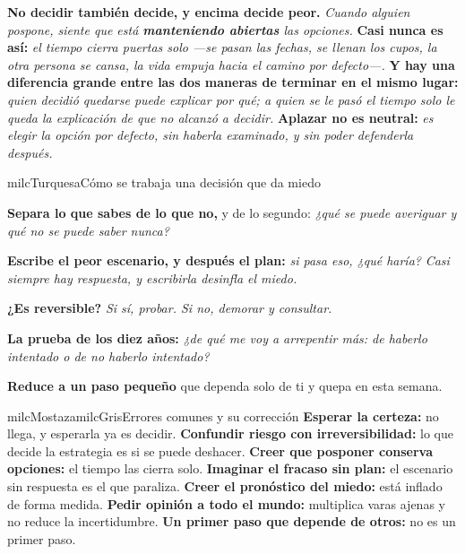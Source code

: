 \documentclass[11pt,letterpaper]{article}
\newcommand{\milcpaso}[3]{%
\Needspace{4\baselineskip}%
\begin{tcolorbox}[enhanced,colback=white,colframe=milcLinea,arc=1.5mm,boxrule=.9pt,
  left=14mm,right=4mm,top=3mm,bottom=3mm,before skip=4pt,after skip=4pt,
  fontupper=\RaggedRight,
  overlay={\node[anchor=north west,circle,fill=#2,text=white,inner sep=0pt,
    minimum size=7.4mm,font=\sffamily\bfseries\small]
    at ([xshift=3.6mm,yshift=-3.2mm]frame.north west) {#1};}]
#3
\end{tcolorbox}}
\begin{document}
\milcpaso{4}{milcTurquesa}{\textbf{No decidir también decide, y encima decide peor.} \emph{Cuando alguien pospone, siente que está \textbf{manteniendo abiertas} las opciones.} \textbf{Casi nunca es así:} \emph{el tiempo cierra puertas solo ---se pasan las fechas, se llenan los cupos, la otra persona se cansa, la vida empuja hacia el camino por defecto---.} \textbf{Y hay una diferencia grande entre las dos maneras de terminar en el mismo lugar:} \emph{quien decidió quedarse puede explicar por qué; a quien se le pasó el tiempo solo le queda la explicación de que no alcanzó a decidir.} \textbf{Aplazar no es neutral:} \emph{es elegir la opción por defecto, sin haberla examinado, y sin poder defenderla después.}}

\begin{drawbox}{milcTurquesa}{Cómo se trabaja una decisión que da miedo}
\begin{pasoslista}
\item \textbf{Separa lo que sabes de lo que no,} y de lo segundo: \emph{¿qué se puede averiguar y qué no se puede saber nunca?}
\item \textbf{Escribe el peor escenario, y después el plan:} \emph{si pasa eso, ¿qué haría?} \emph{Casi siempre hay respuesta, y escribirla desinfla el miedo.}
\item \textbf{¿Es reversible?} \emph{Si sí, probar. Si no, demorar y consultar.}
\item \textbf{La prueba de los diez años:} \emph{¿de qué me voy a arrepentir más: de haberlo intentado o de no haberlo intentado?}
\item \textbf{Reduce a un paso pequeño} que dependa solo de ti y quepa en esta semana.
\end{pasoslista}
\end{drawbox}

\begin{softbox}{milcMostaza}{milcGris}{Errores comunes y su corrección}
\textbf{Esperar la certeza:} no llega, y esperarla ya es decidir. \textbf{Confundir riesgo con irreversibilidad:} lo que decide la estrategia es si se puede deshacer. \textbf{Creer que posponer conserva opciones:} el tiempo las cierra solo. \textbf{Imaginar el fracaso sin plan:} el escenario sin respuesta es el que paraliza. \textbf{Creer el pronóstico del miedo:} está inflado de forma medida. \textbf{Pedir opinión a todo el mundo:} multiplica varas ajenas y no reduce la incertidumbre. \textbf{Un primer paso que depende de otros:} no es un primer paso.
\end{softbox}
\end{document}
